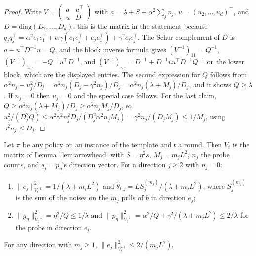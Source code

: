 \documentclass[anon]{alt2027} %
\begin{document}
\begin{proof}
Write $V=\begin{pmatrix}a&u^\top\\ u&D\end{pmatrix}$ with
$a=\lambda+S+\alpha^2\sum_jn_j$, $u=(u_2,\dots,u_d)^\top$, and
$D=\mathrm{diag}(D_2,\dots,D_d)$; this is the matrix in the statement because
$q_jq_j^\top=\alpha^2e_1e_1^\top+\alpha \gamma(e_1e_j^\top+e_je_1^\top)+\gamma^2e_je_j^\top$.
The Schur complement of $D$ is $a-u^\top D^{-1}u=Q$, and the block inverse
formula gives
$(V^{-1})_{11}=Q^{-1}$, $(V^{-1})_{1,\cdot}=-Q^{-1}u^\top D^{-1}$, and
$(V^{-1})_{\cdot,\cdot}=D^{-1}+D^{-1}uu^\top D^{-1}Q^{-1}$ on the lower block,
which are the displayed entries. The second expression for $Q$ follows from
$\alpha^2n_j-u_j^2/D_j=\alpha^2n_j(D_j-\gamma^2n_j)/D_j=\alpha^2n_j(\lambda+M_j)/D_j$,
and it shows $Q\ge\lambda$. If $n_j=0$ then $u_j=0$ and the special case
follows. For the last claim, $Q\ge\alpha^2n_j(\lambda+M_j)/D_j\ge\alpha^2n_jM_j/D_j$,
so $u_j^2/(D_j^2Q)\le\alpha^2\gamma^2n_j^2D_j/(D_j^2\alpha^2n_jM_j)=\gamma^2n_j/(D_jM_j)\le1/M_j$,
using $\gamma^2n_j\le D_j$.
\end{proof}

\begin{lemma}
\label{lem:cat-state}
Let $\pi$ be any policy on an instance of the template and $t$ a round. Then
$V_t$ is the matrix of Lemma~\ref{lem:arrowhead} with $S=\eta^2s$, $M_j=m_jL^2$,
$n_j$ the probe counts, and $q_j=p_\eta$'s direction vector. For a direction
$j\ge2$ with $n_j=0$:
\begin{enumerate}[itemsep=1pt,topsep=1pt,leftmargin=*]
\item[(a)] $\|e_j\|^2_{V_t^{-1}}=1/(\lambda+m_jL^2)$ and
$\widehat\theta_{t,j}=LS_j^{(m_j)}/(\lambda+m_jL^2)$, where $S_j^{(m_j)}$ is the
sum of the noises on the $m_j$ pulls of $b$ in direction $e_j$;
\item[(b)] $\|g_\eta\|^2_{V_t^{-1}}=\eta^2/Q\le1/\lambda$ and
$\|p_\eta\|^2_{V_t^{-1}}=\alpha^2/Q+\gamma^2/(\lambda+m_jL^2)\le2/\lambda$ for the probe
in direction $e_j$.
\end{enumerate}
For any direction with $m_j\ge1$, $\|e_j\|^2_{V_t^{-1}}\le2/(m_jL^2)$.
\end{lemma}
\end{document}
